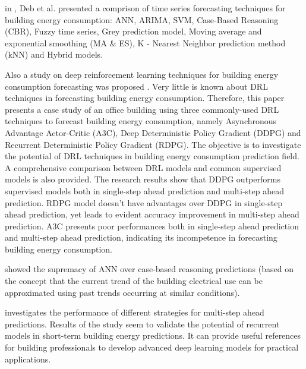 in \cite{DEB2017902}, Deb et al. presented a comprison of time series forecasting techniques for building energy consumption: ANN, ARIMA, SVM, Case-Based Reasoning (CBR), Fuzzy time series, Grey prediction model, Moving average and exponential smoothing (MA \& ES), K - Nearest Neighbor prediction method (kNN) and Hybrid models.

Also a study on deep reinforcement learning techniques for building energy consumption forecasting was proposed \cite{LIU2020109675}.
Very little is known about DRL techniques in forecasting building energy consumption.
Therefore, this paper presents a case study of an office building using three commonly-used DRL techniques to forecast building energy consumption, namely Asynchronous Advantage Actor-Critic (A3C), Deep Deterministic Policy Gradient (DDPG) and Recurrent Deterministic Policy Gradient (RDPG).
The objective is to investigate the potential of DRL techniques in building energy consumption prediction field.
A comprehensive comparison between DRL models and common supervised models is also provided.
The research results show that DDPG outperforms supervised models both in single-step ahead prediction and multi-step ahead prediction.
RDPG model doesn’t have advantages over DDPG in single-step ahead prediction, yet leads to evident accuracy improvement in multi-step ahead prediction.
A3C presents poor performances both in single-step ahead prediction and multi-step ahead prediction, indicating its incompetence in forecasting building energy consumption.

\cite{PLATON201510} showed the supremacy of ANN over case-based reasoning predictions (based on the concept that the current trend of the building electrical use can be approximated using past trends occurring at similar conditions).

\cite{FAN2019700} investigates the performance of different strategies for multi-step ahead predictions.
Results of the study seem to validate the potential of recurrent models in short-term building energy predictions.
It can provide useful references for building professionals to develop advanced deep learning models for practical applications.

